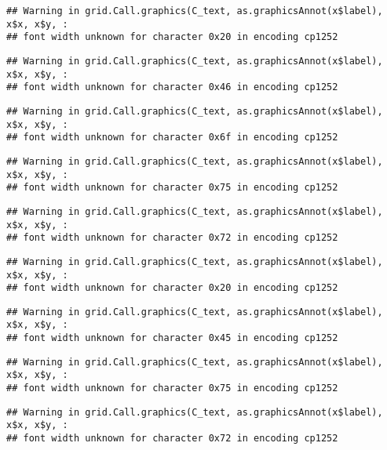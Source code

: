 \documentclass[
]{article}
\begin{document}
\begin{verbatim}
## Warning in grid.Call.graphics(C_text, as.graphicsAnnot(x$label), x$x, x$y, :
## font width unknown for character 0x20 in encoding cp1252
\end{verbatim}

\begin{verbatim}
## Warning in grid.Call.graphics(C_text, as.graphicsAnnot(x$label), x$x, x$y, :
## font width unknown for character 0x46 in encoding cp1252
\end{verbatim}

\begin{verbatim}
## Warning in grid.Call.graphics(C_text, as.graphicsAnnot(x$label), x$x, x$y, :
## font width unknown for character 0x6f in encoding cp1252
\end{verbatim}

\begin{verbatim}
## Warning in grid.Call.graphics(C_text, as.graphicsAnnot(x$label), x$x, x$y, :
## font width unknown for character 0x75 in encoding cp1252
\end{verbatim}

\begin{verbatim}
## Warning in grid.Call.graphics(C_text, as.graphicsAnnot(x$label), x$x, x$y, :
## font width unknown for character 0x72 in encoding cp1252
\end{verbatim}

\begin{verbatim}
## Warning in grid.Call.graphics(C_text, as.graphicsAnnot(x$label), x$x, x$y, :
## font width unknown for character 0x20 in encoding cp1252
\end{verbatim}

\begin{verbatim}
## Warning in grid.Call.graphics(C_text, as.graphicsAnnot(x$label), x$x, x$y, :
## font width unknown for character 0x45 in encoding cp1252
\end{verbatim}

\begin{verbatim}
## Warning in grid.Call.graphics(C_text, as.graphicsAnnot(x$label), x$x, x$y, :
## font width unknown for character 0x75 in encoding cp1252
\end{verbatim}

\begin{verbatim}
## Warning in grid.Call.graphics(C_text, as.graphicsAnnot(x$label), x$x, x$y, :
## font width unknown for character 0x72 in encoding cp1252
\end{verbatim}
\end{document}
